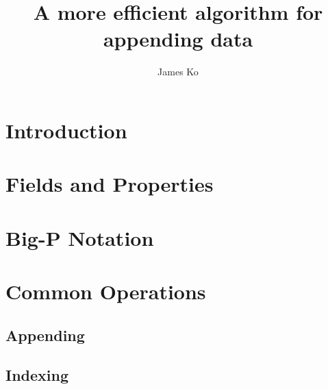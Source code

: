 \documentclass{article}
\title{A more efficient algorithm for appending data}
\author{James Ko}
\begin{document}
	\begin{titlepage}
		\maketitle
	\end{titlepage}
	
	\tableofcontents
	\newpage
	
	\begin{abstract}
		
	\end{abstract}

	\section{Introduction}

	
	
	\section{Fields and Properties}
	
	
	
	\section{Big-P Notation}
	
	
	
	\section{Common Operations}
	
	
	
	\subsection{Appending}
	
	
	
	
	
	
	
	
	
	\subsection{Indexing}
	
	
	
	
	
\end{document}
